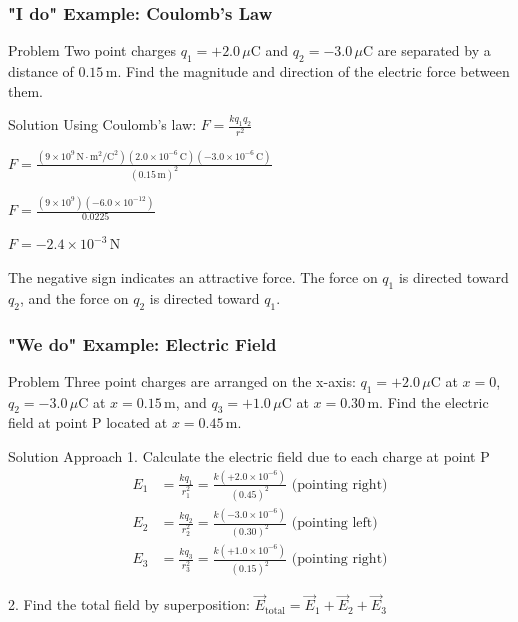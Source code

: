 \documentclass{beamer}
\begin{document}
\begin{frame}
    \frametitle{"I do" Example: Coulomb's Law}
    \begin{block}{Problem}
        Two point charges $q_1 = +2.0 \, \mu\text{C}$ and $q_2 = -3.0 \, \mu\text{C}$ are separated by a distance of $0.15 \, \text{m}$. Find the magnitude and direction of the electric force between them.
    \end{block}
    \pause
    \begin{block}{Solution}
        Using Coulomb's law: $F = \frac{kq_1q_2}{r^2}$
        
        $F = \frac{(9 \times 10^9 \, \text{N} \cdot \text{m}^2/\text{C}^2)(2.0 \times 10^{-6} \, \text{C})(-3.0 \times 10^{-6} \, \text{C})}{(0.15 \, \text{m})^2}$
        
        $F = \frac{(9 \times 10^9)(-6.0 \times 10^{-12})}{0.0225}$
        
        $F = -2.4 \times 10^{-3} \, \text{N}$
        
        The negative sign indicates an attractive force. The force on $q_1$ is directed toward $q_2$, and the force on $q_2$ is directed toward $q_1$.
    \end{block}
\end{frame}

\begin{frame}
    \frametitle{"We do" Example: Electric Field}
    \begin{block}{Problem}
        Three point charges are arranged on the x-axis: $q_1 = +2.0 \, \mu\text{C}$ at $x = 0$, $q_2 = -3.0 \, \mu\text{C}$ at $x = 0.15 \, \text{m}$, and $q_3 = +1.0 \, \mu\text{C}$ at $x = 0.30 \, \text{m}$. Find the electric field at point P located at $x = 0.45 \, \text{m}$.
    \end{block}
        \pause

    \begin{block}{Solution Approach}
        1. Calculate the electric field due to each charge at point P
        \begin{align}
            E_1 &= \frac{kq_1}{r_1^2} = \frac{k(+2.0 \times 10^{-6})}{(0.45)^2} \text{ (pointing right)} \\
            E_2 &= \frac{kq_2}{r_2^2} = \frac{k(-3.0 \times 10^{-6})}{(0.30)^2} \text{ (pointing left)} \\
            E_3 &= \frac{kq_3}{r_3^2} = \frac{k(+1.0 \times 10^{-6})}{(0.15)^2} \text{ (pointing right)}
        \end{align}
        
        2. Find the total field by superposition: $\vec{E}_{\text{total}} = \vec{E}_1 + \vec{E}_2 + \vec{E}_3$
    \end{block}
\end{frame}
\end{document}
